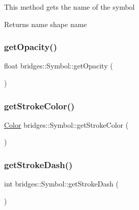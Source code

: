 This method gets the name of the symbol

\begin{DoxyReturn}{Returns}
name shape name 
\end{DoxyReturn}
\mbox{\label{classbridges_1_1_symbol_abeda0c1f43346b91f028d2df80e270dc}} 
\subsubsection{\texorpdfstring{getOpacity()}{getOpacity()}}
{\footnotesize\ttfamily float bridges\+::\+Symbol\+::get\+Opacity (\begin{DoxyParamCaption}{ }\end{DoxyParamCaption})\hspace{0.3cm}{\ttfamily [inline]}}

\mbox{\label{classbridges_1_1_symbol_ad783260351a4e85612807d039565880d}} 
\subsubsection{\texorpdfstring{getStrokeColor()}{getStrokeColor()}}
{\footnotesize\ttfamily \mbox{\hyperlink{classbridges_1_1_color}{Color}} bridges\+::\+Symbol\+::get\+Stroke\+Color (\begin{DoxyParamCaption}{ }\end{DoxyParamCaption})\hspace{0.3cm}{\ttfamily [inline]}}

\mbox{\label{classbridges_1_1_symbol_aebd8935bc4f963a04412aa544beee27b}} 
\subsubsection{\texorpdfstring{getStrokeDash()}{getStrokeDash()}}
{\footnotesize\ttfamily int bridges\+::\+Symbol\+::get\+Stroke\+Dash (\begin{DoxyParamCaption}{ }\end{DoxyParamCaption})\hspace{0.3cm}{\ttfamily [inline]}}

